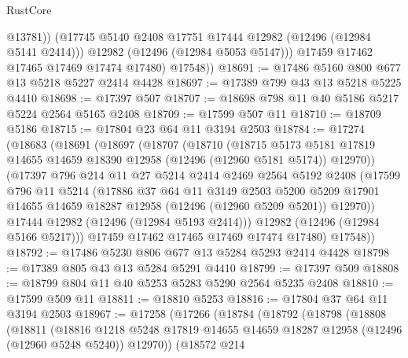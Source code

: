 \begin{lexlean}{RustCore}
\begin{coremodule}
                @13781))
            (@17745 @5140 @2408 @17751 @17444 @12982 (@12496 (@12984 @5141 @2414)))
            @12982
            (@12496 (@12984 @5053 @5147)))
          @17459
          @17462
          @17465
          @17469
          @17474
          @17480)
        @17548))
@18691 := @17486 @5160 @800 @677 @13 @5218 @5227 @2414 @4428
@18697 := @17389 @799 @43 @13 @5218 @5225 @4410
@18698 := @17397 @507
@18707 := @18698 @798 @11 @40 @5186 @5217 @5224 @2564 @5165 @2408
@18709 := @17599 @507 @11
@18710 := @18709 @5186
@18715 := @17804 @23 @64 @11 @3194 @2503
@18784 := @17274
    (@18683
      (@18691
        (@18697
          (@18707
            (@18710
              (@18715
                @5173
                @5181
                @17819
                @14655
                @14659
                @18390
                @12958
                (@12496 (@12960 @5181 @5174))
                @12970))
            (@17397
              @796
              @214
              @11
              @27
              @5214
              @2414
              @2469
              @2564
              @5192
              @2408
              (@17599
                @796
                @11
                @5214
                (@17886
                  @37
                  @64
                  @11
                  @3149
                  @2503
                  @5200
                  @5209
                  @17901
                  @14655
                  @14659
                  @18287
                  @12958
                  (@12496 (@12960 @5209 @5201))
                  @12970))
              @17444
              @12982
              (@12496 (@12984 @5193 @2414)))
            @12982
            (@12496 (@12984 @5166 @5217)))
          @17459
          @17462
          @17465
          @17469
          @17474
          @17480)
        @17548))
@18792 := @17486 @5230 @806 @677 @13 @5284 @5293 @2414 @4428
@18798 := @17389 @805 @43 @13 @5284 @5291 @4410
@18799 := @17397 @509
@18808 := @18799 @804 @11 @40 @5253 @5283 @5290 @2564 @5235 @2408
@18810 := @17599 @509 @11
@18811 := @18810 @5253
@18816 := @17804 @37 @64 @11 @3194 @2503
@18967 := @17258
    (@17266
      (@18784
        (@18792
          (@18798
            (@18808
              (@18811
                (@18816
                  @1218
                  @5248
                  @17819
                  @14655
                  @14659
                  @18287
                  @12958
                  (@12496 (@12960 @5248 @5240))
                  @12970))
              (@18572
                @214

\end{coremodule}
\end{lexlean}
